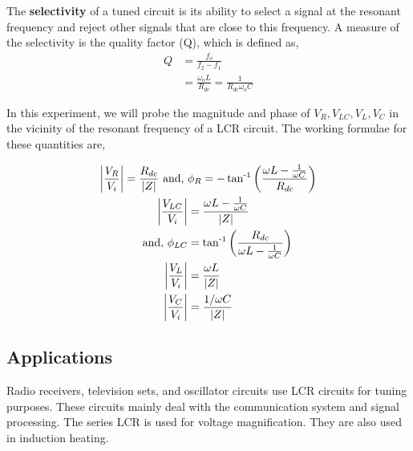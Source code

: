 The \textbf{selectivity} of a tuned circuit is its ability to select a signal at the resonant frequency and reject other signals that are close to this frequency. A measure of the selectivity is the quality factor (Q), which is defined as,
\begin{align}
    Q &= \frac{f_o}{f_2 - f_1} \\
    &= \frac{\omega_o L}{R_{dc}}=\frac{1}{R_{dc}\omega_o C}
\end{align}

In this experiment, we will probe the magnitude and phase of $V_R, V_{LC}, V_L, V_C$ in the vicinity of the resonant frequency of a LCR circuit. The working formulae for these quantities are,

\begin{align}
    \bigg|\frac{V_R}{V_i}\bigg| = \frac{R_{dc}}{|Z|} \text{ and, } &\phi_R = -\operatorname{tan^{-1}}{\left(\frac{\omega L-\frac{1}{\omega C}}{R_{dc}}\right)}\\
    \bigg|\frac{V_{LC}}{V_i}\bigg| &= \frac{\omega L-\frac{1}{\omega C}}{|Z|} \nonumber\\
    \text{ and, } \phi_{LC} &= \operatorname{tan^{-1}}{\left(\frac{R_{dc}}{\omega L-\frac{1}{\omega C}}\right)}\\
    \bigg|\frac{V_L}{V_i}\bigg| &= \frac{\omega L}{|Z|}\\
    \bigg|\frac{V_C}{V_i}\bigg| &= \frac{1/\omega C}{|Z|}
\end{align}

\subsection*{Applications}
Radio receivers, television sets, and oscillator circuits use LCR circuits for tuning purposes. These circuits mainly deal with the communication system and signal processing. The series LCR is used for voltage magnification. They are also used in induction heating.